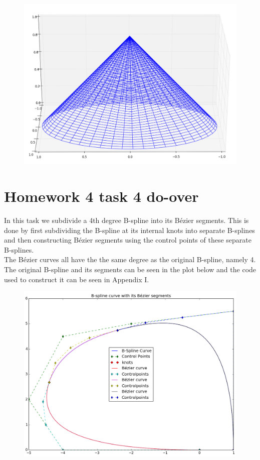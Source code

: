 \documentclass[]{article}
\begin{document}
\begin{figure}[h!]
	\includegraphics[scale=0.3]{nurbscone}
\end{figure}
\newpage
\section*{Homework 4 task 4 do-over}
In this task we subdivide a 4th degree B-spline into its B\'{e}zier segments. This is done by first subdividing the B-spline at its internal knots into separate B-splines and then constructing B\'{e}zier segments using the control points of these separate B-splines.\\
The B\'{e}zier curves all have the the same degree as the original B-spline, namely 4. The original B-spline and its segments can be seen in the plot below and the code used to construct it can be seen in Appendix I.
\begin{figure}[h!]
	\includegraphics[scale=0.4]{task4_doover}
\end{figure}
\end{document}
